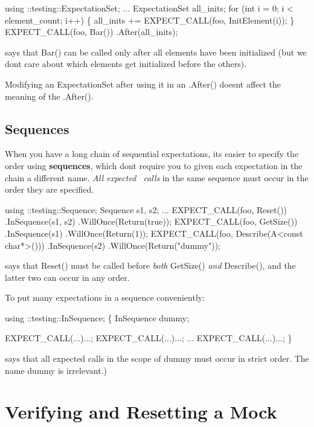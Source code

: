 \begin{DoxyCode}
using ::testing::ExpectationSet;
...
ExpectationSet all\_inits;
for (int i = 0; i < element\_count; i++) \{
  all\_inits += EXPECT\_CALL(foo, InitElement(i));
\}
EXPECT\_CALL(foo, Bar())
    .After(all\_inits);
\end{DoxyCode}
 says that {\ttfamily Bar()} can be called only after all elements have been initialized (but we don\textquotesingle{}t care about which elements get initialized before the others).

Modifying an {\ttfamily Expectation\+Set} after using it in an {\ttfamily .After()} doesn\textquotesingle{}t affect the meaning of the {\ttfamily .After()}.

\subsection*{Sequences}

When you have a long chain of sequential expectations, it\textquotesingle{}s easier to specify the order using {\bfseries sequences}, which don\textquotesingle{}t require you to given each expectation in the chain a different name. {\itshape All expected~\newline
 calls} in the same sequence must occur in the order they are specified.


\begin{DoxyCode}
using ::testing::Sequence;
Sequence s1, s2;
...
EXPECT\_CALL(foo, Reset())
    .InSequence(s1, s2)
    .WillOnce(Return(true));
EXPECT\_CALL(foo, GetSize())
    .InSequence(s1)
    .WillOnce(Return(1));
EXPECT\_CALL(foo, Describe(A<const char*>()))
    .InSequence(s2)
    .WillOnce(Return("dummy"));
\end{DoxyCode}
 says that {\ttfamily Reset()} must be called before {\itshape both} {\ttfamily Get\+Size()} {\itshape and} {\ttfamily Describe()}, and the latter two can occur in any order.

To put many expectations in a sequence conveniently\+: 
\begin{DoxyCode}
using ::testing::InSequence;
\{
  InSequence dummy;

  EXPECT\_CALL(...)...;
  EXPECT\_CALL(...)...;
  ...
  EXPECT\_CALL(...)...;
\}
\end{DoxyCode}
 says that all expected calls in the scope of {\ttfamily dummy} must occur in strict order. The name {\ttfamily dummy} is irrelevant.)

\section*{Verifying and Resetting a Mock}

